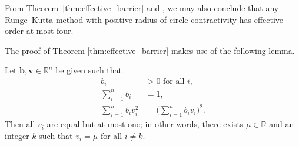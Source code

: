 \begin{remark}
	From Theorem~\ref{thm:effective_barrier} and \cite[Theorem~4.1]{dahlquist2006}, 
  	we may also conclude that any Runge--Kutta method with positive radius of
  	circle contractivity has effective order at most four.
\end{remark}

The proof of Theorem \ref{thm:effective_barrier} makes use of the following 
lemma.
\begin{lemma}\label{Davids_lemma}
	Let $\bm{b},\bm{v} \in \mathbb{R}^{n}$ be given such that
    \begin{subequations}\label{eq:DavidsLemma}
    		\begin{align}
    			b_i & > 0 \mbox{ for all } i, \label{eq:DavidsLemma_a} \\
    			\sum_{i=1}^n b_i & = 1, \label{eq:DavidsLemma_b} \\
    			\sum_{i=1}^n b_i v_i^2 & = \biggl(\sum_{i=1}^n b_i v_i\biggr)^{\!\! 2}. \label{eq:DavidsLemma_c}
    		\end{align}
    	\end{subequations}
    	Then all $v_i$ are equal but at most one; in other words, there exists 
    	$\mu \in \mathbb{R}$ and an integer $k$ such that $v_i = \mu$ for 
    	all $i \ne k$.
\end{lemma}

